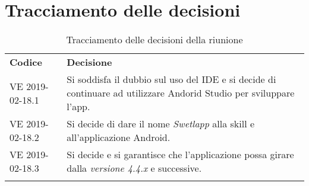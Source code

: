 \clearpage
\section{Tracciamento delle decisioni}
\begin{center}
	\renewcommand{\arraystretch}{1.5}
	\begin{longtable}{  p{2.8cm} p{11.4cm} }
		\rowcolor{tableHeadYellow}
		\textbf{Codice}&\textbf{Decisione}\\
		VE 2019-02-18.1 & Si soddisfa il dubbio sul uso del IDE e si decide di continuare ad utilizzare Andorid Studio per sviluppare l'app.\\
		VE 2019-02-18.2 & Si decide di dare il nome \textit{Swetlapp} alla skill e all'applicazione Android.\\
		VE 2019-02-18.3 & Si decide e si garantisce che l'applicazione possa girare dalla \textit{versione 4.4.x} e successive.\\
		\rowcolor{white}
		\caption{Tracciamento delle decisioni della riunione}
	\end{longtable}	
\end{center}
